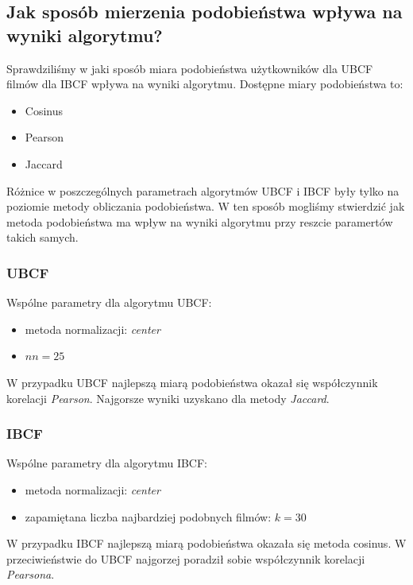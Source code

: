 \documentclass[12pt, a4paper]{article}
\begin{document}
\subsection{Jak sposób mierzenia podobieństwa wpływa na wyniki algorytmu?}
Sprawdziliśmy w jaki sposób miara podobieństwa użytkowników dla UBCF filmów dla IBCF wpływa na wyniki algorytmu.
Dostępne miary podobieństwa to:
\begin{itemize}
\item Cosinus
\item Pearson
\item Jaccard
\end{itemize}

Różnice w poszczególnych parametrach algorytmów UBCF i IBCF były tylko na poziomie metody obliczania podobieństwa. W ten sposób mogliśmy stwierdzić jak metoda podobieństwa ma wpływ na wyniki algorytmu przy reszcie paramertów takich samych. 

\subsubsection{UBCF}
Wspólne parametry dla algorytmu UBCF:
\begin{itemize}
\item metoda normalizacji: \emph{center}
\item $nn = 25$
\end{itemize}

W przypadku UBCF najlepszą miarą podobieństwa okazał się współczynnik korelacji \emph{Pearson}. Najgorsze wyniki uzyskano dla metody \emph{Jaccard}.



\subsubsection{IBCF}
Wspólne parametry dla algorytmu IBCF:
\begin{itemize}
\item metoda normalizacji: \emph{center}
\item zapamiętana liczba najbardziej podobnych filmów: $k = 30$
\end{itemize}

W przypadku IBCF najlepszą miarą podobieństwa okazała się metoda cosinus. W przeciwieństwie do UBCF najgorzej poradził sobie współczynnik korelacji \emph{Pearsona}.
\end{document}
